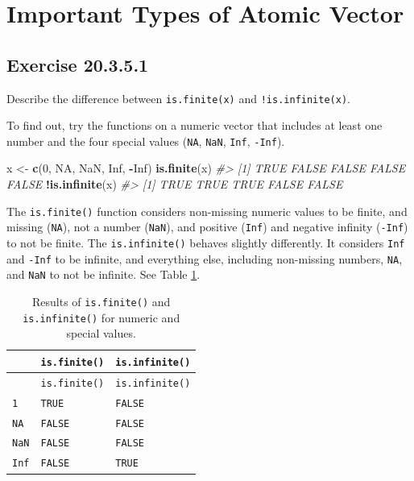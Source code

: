 \documentclass[]{book}
\newenvironment{Shaded}{\begin{snugshade}}{\end{snugshade}}
\newcommand{\CommentTok}[1]{\textcolor[rgb]{0.56,0.35,0.01}{\textit{#1}}}
\newcommand{\DecValTok}[1]{\textcolor[rgb]{0.00,0.00,0.81}{#1}}
\newcommand{\KeywordTok}[1]{\textcolor[rgb]{0.13,0.29,0.53}{\textbf{#1}}}
\newcommand{\NormalTok}[1]{#1}
\newcommand{\OperatorTok}[1]{\textcolor[rgb]{0.81,0.36,0.00}{\textbf{#1}}}
\newcommand{\OtherTok}[1]{\textcolor[rgb]{0.56,0.35,0.01}{#1}}
\newcommand{\StringTok}[1]{\textcolor[rgb]{0.31,0.60,0.02}{#1}}
\theoremstyle{plain}
\theoremstyle{remark}
\begin{document}
\hypertarget{important-types-of-atomic-vector}{%
\section{Important Types of Atomic Vector}\label{important-types-of-atomic-vector}}

\hypertarget{exercise-20.3.5.1}{%
\subsection*{\texorpdfstring{Exercise {20.3.5.1}}{Exercise 20.3.5.1}}\label{exercise-20.3.5.1}}

Describe the difference between \texttt{is.finite(x)} and \texttt{!is.infinite(x)}.

To find out, try the functions on a numeric vector that includes at least one number and the four special values (\texttt{NA}, \texttt{NaN}, \texttt{Inf}, \texttt{-Inf}).

\begin{Shaded}
\begin{Highlighting}[]
\NormalTok{x <-}\StringTok{ }\KeywordTok{c}\NormalTok{(}\DecValTok{0}\NormalTok{, }\OtherTok{NA}\NormalTok{, }\OtherTok{NaN}\NormalTok{, }\OtherTok{Inf}\NormalTok{, }\OperatorTok{-}\OtherTok{Inf}\NormalTok{)}
\KeywordTok{is.finite}\NormalTok{(x)}
\CommentTok{#> [1]  TRUE FALSE FALSE FALSE FALSE}
\OperatorTok{!}\KeywordTok{is.infinite}\NormalTok{(x)}
\CommentTok{#> [1]  TRUE  TRUE  TRUE FALSE FALSE}
\end{Highlighting}
\end{Shaded}

The \texttt{is.finite()} function considers non-missing numeric values to be finite,
and missing (\texttt{NA}), not a number (\texttt{NaN}), and positive (\texttt{Inf}) and negative infinity (\texttt{-Inf}) to not be finite. The \texttt{is.infinite()} behaves slightly differently.
It considers \texttt{Inf} and \texttt{-Inf} to be infinite, and everything else, including non-missing numbers, \texttt{NA}, and \texttt{NaN} to not be infinite. See Table \ref{tab:finite-infinite}.

\begin{longtable}[]{@{}lll@{}}
\caption{\label{tab:finite-infinite} Results of \texttt{is.finite()} and \texttt{is.infinite()} for
numeric and special values.}\tabularnewline
\toprule
& \texttt{is.finite()} & \texttt{is.infinite()}\tabularnewline
\midrule
\endfirsthead
\toprule
& \texttt{is.finite()} & \texttt{is.infinite()}\tabularnewline
\midrule
\endhead
\texttt{1} & \texttt{TRUE} & \texttt{FALSE}\tabularnewline
\texttt{NA} & \texttt{FALSE} & \texttt{FALSE}\tabularnewline
\texttt{NaN} & \texttt{FALSE} & \texttt{FALSE}\tabularnewline
\texttt{Inf} & \texttt{FALSE} & \texttt{TRUE}\tabularnewline
\bottomrule
\end{longtable}
\end{document}
